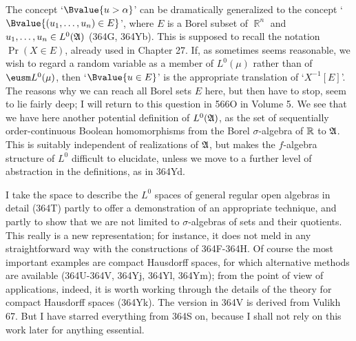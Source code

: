{The concept `$\Bvalue{u>\alpha}$' can be dramatically generalized to
the concept `$\Bvalue{(u_1,\ldots,u_n)\in E}$', where $E$ is a Borel
subset of $\BbbR^n$ and $u_1,\ldots,u_n\in L^0(\frak A)$ (364G,
364Yb).   This is supposed to recall the notation $\Pr(X\in E)$,
already used in Chapter 27.   If, as sometimes seems reasonable, we wish
to regard a random variable as a member of $L^0(\mu)$ rather than of
$\eusm L^0(\mu)$, then `$\Bvalue{u\in E}$' is the appropriate
translation of `$X^{-1}[E]$'.   The reasons why we can reach all Borel
sets $E$ here,
but then have to stop, seem to lie fairly deep;  I will return to this
question in 566O in Volume 5.
We see that we have
here another potential definition of $L^0(\frak A)$, as the set of
sequentially order-continuous Boolean homomorphisms from the Borel
$\sigma$-algebra of $\Bbb R$ to $\frak A$.   This is suitably
independent of realizations of $\frak A$, but makes the $f$-algebra
structure of $L^0$ difficult to elucidate, unless we move to a further
level of abstraction in the definitions, as in 364Yd.

I take the space to describe the $L^0$ spaces of general regular open
algebras in detail (364T) partly to offer a demonstration of an
appropriate technique, and partly to show that we are not limited to
$\sigma$-algebras of sets and their quotients.   This really is a new
representation;  for instance, it does not meld in any straightforward
way with the constructions of 364F-364H.   Of course the most
important examples are compact Hausdorff spaces, for which alternative
methods are available (364U-364V, 364Yj, 364Yl, 364Ym);  from the point
of view of applications, indeed, it is worth working through the details of
the theory for compact
Hausdorff spaces (364Yk).   The version in 364V is derived
from {\smc Vulikh 67}.   But I have starred everything from 364S on,
because I shall not rely on this work later for anything essential.
}%

\discrpage

